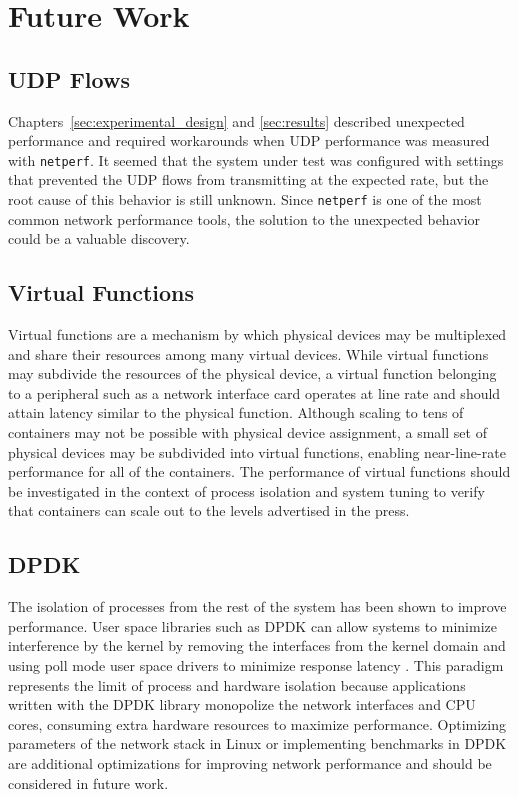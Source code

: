 \section{Future Work}
\label{sec:futurework}

\subsection{UDP Flows} %
\label{sec:futureudpflows}
Chapters~\ref{sec:experimental_design} and \ref{sec:results} described unexpected performance and required workarounds when UDP performance was measured with \texttt{netperf}. 
It seemed that the system under test was configured with settings that prevented the UDP flows from transmitting at the expected rate, but the root cause of this behavior is still unknown.  
Since \texttt{netperf} is one of the most common network performance tools, the solution to the unexpected behavior could be a valuable discovery.

\subsection{Virtual Functions} %
\label{sec:futurevirtualfunctions}
Virtual functions are a mechanism by which physical devices may be multiplexed and share their resources among many virtual devices.  
While virtual functions may subdivide the resources of the physical device, a virtual function belonging to a peripheral such as a network interface card operates at line rate and should attain latency similar to the physical function.  
Although scaling to tens of containers may not be possible with physical device assignment, a small set of physical devices may be subdivided into virtual functions, enabling near-line-rate performance for all of the containers.  
The performance of virtual functions should be investigated in the context of process isolation and system tuning to verify that containers can scale out to the levels advertised in the press.  

\subsection{DPDK} %
\label{sec:futuredpdk}
The isolation of processes from the rest of the system has been shown to improve performance.
User space libraries such as DPDK can allow systems to minimize interference by the kernel by removing the interfaces from the kernel domain and using poll mode user space drivers to minimize response latency \autocite{_dpdk_1}.  
This paradigm represents the limit of process and hardware isolation because applications written with the DPDK library monopolize the network interfaces and CPU cores, consuming extra hardware resources to maximize performance.
Optimizing parameters of the network stack in Linux or implementing benchmarks in DPDK are additional optimizations for improving network performance and should be considered in future work.

